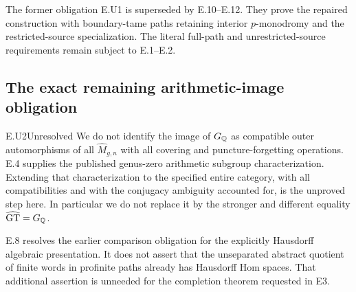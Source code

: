 



The former obligation E.U1 is superseded by E.10--E.12.
They prove the repaired construction with boundary-tame paths
retaining interior $p$-monodromy and the restricted-source
specialization. The literal full-path and unrestricted-source
requirements remain subject to E.1--E.2.

\subsection{The exact remaining arithmetic-image obligation}

\begin{claim}{E.U2}{Unresolved}
We do not identify the image of $G_\mathbb Q$ as compatible outer
automorphisms of all $\widehat M_{g,n}$ with all covering and
puncture-forgetting operations. E.4 supplies the published
genus-zero arithmetic subgroup characterization. Extending that
characterization to the specified entire category, with all
compatibilities and with the conjugacy ambiguity accounted for,
is the unproved step here. In particular we do not replace it by
the stronger and different equality $\widehat{\mathrm{GT}}=G_\mathbb Q$.
\end{claim}

E.8 resolves the earlier comparison obligation for the explicitly
Hausdorff algebraic presentation. It does not assert that the
unseparated abstract quotient of finite words in profinite paths
already has Hausdorff Hom spaces. That additional assertion is
unneeded for the completion theorem requested in E3.
